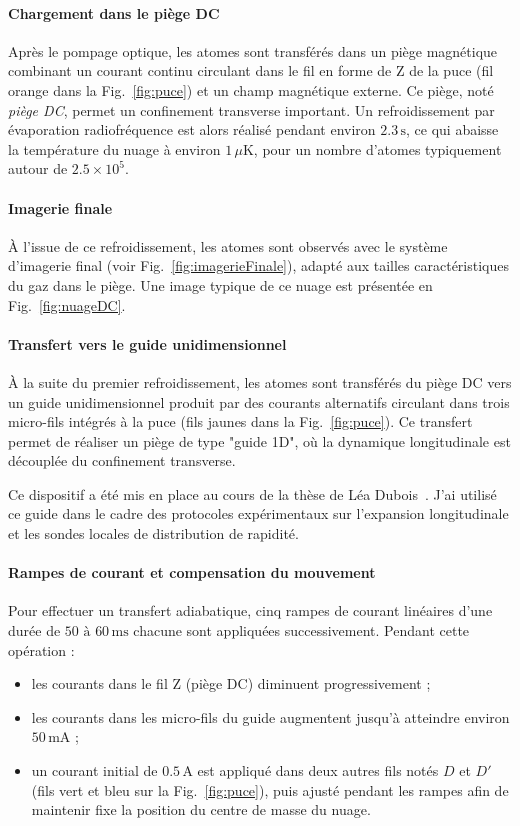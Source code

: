 \paragraph{Chargement dans le piège DC}
Après le pompage optique, les atomes sont transférés dans un piège magnétique combinant un courant continu circulant dans le fil en forme de Z de la puce (fil orange dans la Fig.~\ref{fig:puce}) et un champ magnétique externe. Ce piège, noté \emph{piège DC}, permet un confinement transverse important. Un refroidissement par évaporation radiofréquence est alors réalisé pendant environ \( 2.3\,\mathrm{s} \), ce qui abaisse la température du nuage à environ \( 1\,\mu\mathrm{K} \), pour un nombre d’atomes typiquement autour de \( 2.5 \times 10^5 \).

\paragraph{Imagerie finale}
À l’issue de ce refroidissement, les atomes sont observés avec le système d’imagerie final (voir Fig.~\ref{fig:imagerieFinale}), adapté aux tailles caractéristiques du gaz dans le piège. Une image typique de ce nuage est présentée en Fig.~\ref{fig:nuageDC}.

\paragraph{Transfert vers le guide unidimensionnel}
À la suite du premier refroidissement, les atomes sont transférés du piège DC vers un guide unidimensionnel produit par des courants alternatifs circulant dans trois micro-fils intégrés à la puce (fils jaunes dans la Fig.~\ref{fig:puce}). Ce transfert permet de réaliser un piège de type "guide 1D", où la dynamique longitudinale est découplée du confinement transverse.

Ce dispositif a été mis en place au cours de la thèse de Léa Dubois~\cite{TheseLea}. J’ai utilisé ce guide dans le cadre des protocoles expérimentaux sur l’expansion longitudinale et les sondes locales de distribution de rapidité.

\paragraph{Rampes de courant et compensation du mouvement}
Pour effectuer un transfert adiabatique, cinq rampes de courant linéaires d'une durée de \( 50 \text{ à } 60\,\mathrm{ms} \) chacune sont appliquées successivement. Pendant cette opération :
\begin{itemize}
    \item les courants dans le fil Z (piège DC) diminuent progressivement ;
    \item les courants dans les micro-fils du guide augmentent jusqu’à atteindre environ \( 50\,\mathrm{mA} \) ;
    \item un courant initial de \( 0.5\,\mathrm{A} \) est appliqué dans deux autres fils notés \( D \) et \( D' \) (fils vert et bleu sur la Fig.~\ref{fig:puce}), puis ajusté pendant les rampes afin de maintenir fixe la position du centre de masse du nuage.
\end{itemize}

